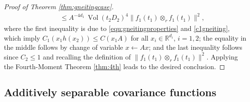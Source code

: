 \documentclass[12pt]{article}
\DeclareMathOperator{\1}{1}
\DeclareMathOperator{\vol}{Vol}
\theoremstyle{plain}
\theoremstyle{definition}
\begin{document}
\begin{proof}[Proof of Theorem \ref{thm:gneitingcase}]
\begin{align}
       &\quad \le A^{-4d_1}\, \vol(t_2 D_2)^4  \|f_1(t_1)\otimes_r f_1(t_1) \|^2,
\end{align}
    {where the first inequality is due to \eqref{equ:gneitingproperties} and \eqref{c1gneiting}, which imply $C_{1}(x_{1}h(x_{2}))\le C(x_{1}A)$ for all $x_{i}\in\mathbb R^{d_{i}}$, $i=1,2$; the equality in the middle follows by change of variable $x\leftarrow Ax$; and the last inequality follows since $C_{2}\le1$ and recalling the definition of $\|f_1(t_1)\otimes_r f_1(t_1) \|^2$.}
    Applying the Fourth-Moment Theorem \ref{thm:4th} leads to the desired conclusion.
\end{proof}

\subsection{Additively separable covariance functions}\label{subsec:additSep}
\end{document}
